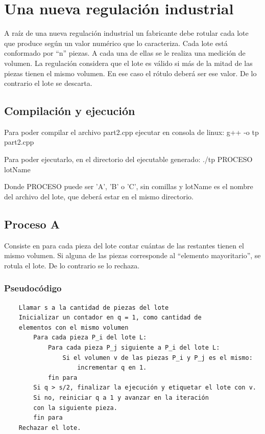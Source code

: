 \section{Una nueva regulación industrial}


A raíz de una nueva regulación industrial un fabricante debe rotular cada lote que produce según un valor numérico que lo caracteriza. Cada lote está conformado por “n” piezas. A cada una de ellas se le realiza una medición de volumen. La regulación considera que el lote es válido si más de la mitad de las piezas tienen el mismo volumen. En ese caso el rótulo deberá ser ese valor. De lo contrario el lote se descarta.

\subsection{Compilación y ejecución}
Para poder compilar el archivo part2.cpp ejecutar en consola de linux: g++ -o tp part2.cpp

Para poder ejecutarlo, en el directorio del ejecutable generado: ./tp PROCESO lotName

Donde PROCESO puede ser 'A', 'B' o 'C', sin comillas y lotName es el nombre del archivo del lote, que deberá estar en el mismo directorio.

\subsection{Proceso A}
Consiste en para cada pieza del lote contar cuántas de las restantes tienen el mismo volumen. Si alguna de las piezas corresponde al “elemento mayoritario”, se rotula el lote. De lo contrario se lo rechaza.
\subsubsection{Pseudocódigo}
\begin{verbatim}
    Llamar s a la cantidad de piezas del lote
    Inicializar un contador en q = 1, como cantidad de
    elementos con el mismo volumen
        Para cada pieza P_i del lote L:
            Para cada pieza P_j siguiente a P_i del lote L:
                Si el volumen v de las piezas P_i y P_j es el mismo:
                    incrementar q en 1.
            fin para
        Si q > s/2, finalizar la ejecución y etiquetar el lote con v.
        Si no, reiniciar q a 1 y avanzar en la iteración
        con la siguiente pieza.
        fin para
    Rechazar el lote.
\end{verbatim}


